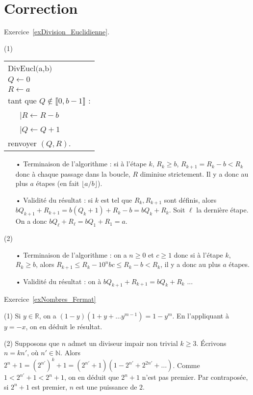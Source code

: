 \documentclass[11pt,a4paper]{article}
\newcommand{\N}{\mathbb{N}}
\newcommand{\R}{\mathbb{R}}
\begin{document}
\section*{Correction}

Exercice~\ref{exDivision_Euclidienne}.

(1) \begin{center}
\begin{tabular}{l}
DivEucl$($a,b$)$\\
$ Q \leftarrow 0$ \\
$R \leftarrow a$ \\
tant que $Q \notin \llbracket 0,b-1\rrbracket$ :\\
\ \ \ {\rm  |}$R\leftarrow R-b$\\
\ \ \ {\rm  |}$Q\leftarrow Q+1$\\
renvoyer $(Q,R)$.

\end{tabular}
\end{center}

\begin{itemize}
\item[•] Terminaison de l'algorithme : si à l'étape $k$, $R_k\geq b$, $R_{k+1}=R_k-b<R_k$ donc à chaque passage dans la boucle, $R$ diminiue strictement. Il y a donc au plus $a$ étapes (en fait $\lfloor a/b\rfloor$).

\item[•] Validité du résultat : si $k$ est tel que $R_k,R_{k+1}$ sont définis, alors $b Q_{k+1} +R_{k+1}= b(Q_k+1)+R_k-b=b Q_k+R_k$. Soit $\ell$ la dernière étape. On a donc $bQ_\ell+R_\ell=b Q_1+R_1=a$.
\end{itemize}

(2) \begin{itemize}
\item[•] Terminaison de l'algorithme : on a $n\geq 0$ et $c\geq 1$ donc si à l'étape $k$, $R_k\geq b$, alors $R_{k+1}\leq R_k-10^n bc\leq R_k-b<R_k$, il y a donc au plus $a$ étapes.

\item[•] Validité du résultat : on à $bQ_{k+1}+R_{k+1}=bQ_k+R_k$ ...
\end{itemize}

Exercice~\ref{exNombres_Fermat}

(1) Si $y\in \R$, on a  $(1-y)(1+y+\ldots y^{m-1})=1-y^m$. En l'appliquant à $y=-x$, on en déduit le résultat.

(2) Supposons que $n$ admet un diviseur impair non trivial $k\geq 3$. Écrivons $n=kn'$, où $n'\in \N$. Alors $2^n+1=(2^{n'})^k+1=(2^{n'}+1)(1-2^{n'}+2^{2n'}+\ldots)$. Comme $1<2^{n'}+1<2^n+1$, on en déduit que $2^n+1$ n'est pas premier. Par contraposée, si $2^n+1$ est premier, $n$ est une puissance de $2$.
\end{document}
